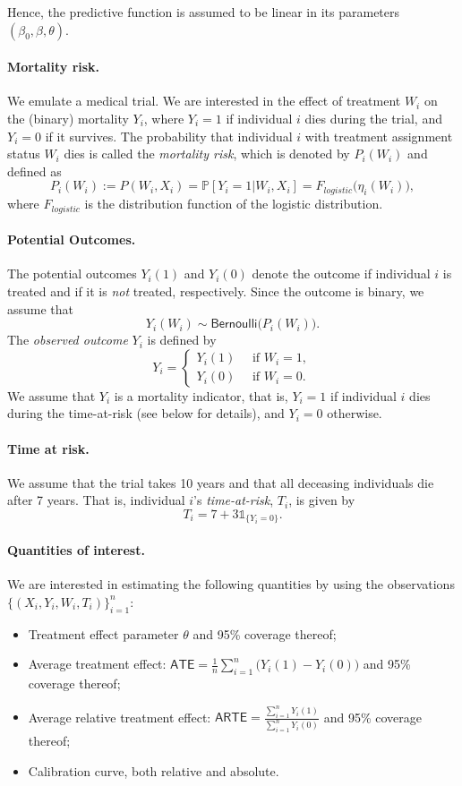 \documentclass[11pt]{article}
\renewcommand{\P}{\mathbb{P}}
\newcommand{\indic}{\mathds{1}}
\begin{document}
Hence, the predictive function is assumed to be linear in its parameters $(\beta_0, \beta, \theta)$.

\paragraph{Mortality risk.} We emulate a medical trial. We are interested in the effect of treatment $W_i$ on the (binary) mortality $Y_i$, where $Y_i=1$ if individual $i$ dies during the trial, and $Y_i=0$ if it survives. The probability that individual $i$ with treatment assignment status $W_i$ dies is called the \textit{mortality risk}, which is denoted by $P_i(W_i)$ and defined as
\[
P_i(W_i) := P(W_i, X_i) = \P [Y_i=1 | W_i, X_i]
= F_{logistic}\Big( \eta_i(W_i) \Big),
\]
where $F_{logistic}$ is the distribution function of the logistic distribution.

\paragraph{Potential Outcomes.} 
The potential outcomes $Y_i(1)$ and $Y_i(0)$ denote the outcome if individual $i$ is treated and if it is \textit{not} treated, respectively. Since the outcome is binary, we assume that
\[
    Y_i(W_i) \sim \textsf{Bernoulli} \Big( P_i(W_i) \Big). 
\]
The \textit{observed outcome} $Y_i$ is defined by
\[
    Y_i = 
    \begin{cases}
    Y_i(1) \quad \text{ if } W_i =1, \\
    Y_i(0) \quad \text{ if } W_i =0.
    \end{cases}
\]
We assume that $Y_i$ is a mortality indicator, that is, $Y_i = 1$ if individual $i$ dies during the time-at-risk (see below for details), and $Y_i = 0$ otherwise.

\paragraph{Time at risk.} We assume that the trial takes 10 years and that all deceasing individuals die after 7 years. That is, individual $i$'s \textit{time-at-risk}, $T_i$, is given by
\[
    T_i = 7 + 3\indic_{\{ Y_i = 0\}}.
\]

\paragraph{Quantities of interest.}
We are interested in estimating the following quantities by using the observations $\{(X_i, Y_i, W_i, T_i)\}_{i=1}^n$:
\begin{itemize}
    \item Treatment effect parameter $\theta$ and 95\% coverage thereof;
    \item Average treatment effect: $\textsf{ATE} = \frac{1}{n} \sum_{i=1}^n \big(Y_i(1) - Y_i(0)\big)$ and 95\% coverage thereof;
    \item Average relative treatment effect: $\textsf{ARTE} = \frac{\sum_{i=1}^n Y_i(1)}{\sum_{i=1}^n Y_i(0)}$ and 95\% coverage thereof;
    \item Calibration curve, both relative and absolute.
\end{itemize}
\end{document}
